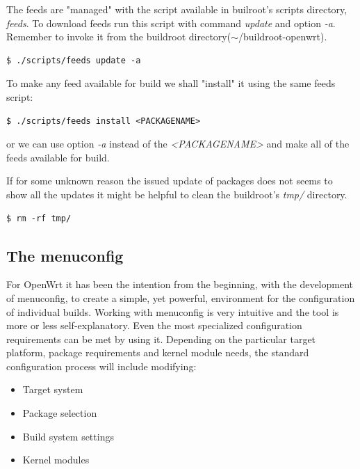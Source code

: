The feeds are "managed" with the script available in builroot's scripts directory, {\it feeds}.
To download feeds run this script with command {\it update} and option {\it -a}.
Remember to invoke it from the buildroot directory($\sim$/buildroot-openwrt).
\begin{lstlisting}[columns=fixed,basicstyle=\ttfamily\footnotesize,tabsize=4,backgroundcolor=\color{yellow!10}]
$ ./scripts/feeds update -a
\end{lstlisting}

To make any feed available for build we shall "install" it using the same feeds script:
\begin{lstlisting}[columns=fixed,basicstyle=\ttfamily\footnotesize,tabsize=4,backgroundcolor=\color{yellow!10}]
$ ./scripts/feeds install <PACKAGENAME>
\end{lstlisting}
or we can use option {\it -a} instead of the {\it <PACKAGENAME>} and make all of the feeds available for build.

If for some unknown reason the issued update of packages does not seems to show all the updates it might be helpful to clean the buildroot's {\it tmp/} directory\cite{feeds}.
\begin{lstlisting}[columns=fixed,basicstyle=\ttfamily\footnotesize,tabsize=4,backgroundcolor=\color{yellow!10}]
$ rm -rf tmp/
\end{lstlisting}

\subsection{The menuconfig}

For OpenWrt it has been the intention from the beginning, with the development of menuconfig, to create a simple, yet powerful, environment for the configuration of individual builds.
Working with menuconfig is very intuitive and the tool is more or less self-explanatory.
Even the most specialized configuration requirements can be met by using it.
Depending on the particular target platform, package requirements and kernel module needs, the standard configuration process will include modifying:
\begin{itemize}
    \item Target system
    \item Package selection
    \item Build system settings
    \item Kernel modules
\end{itemize}

